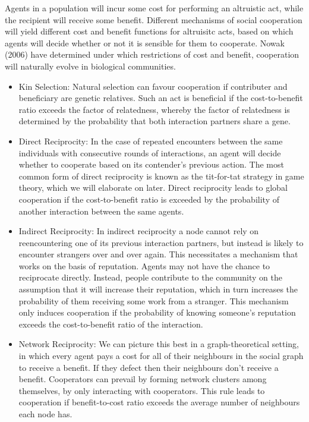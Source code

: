\noindent{}Agents in a population will incur some cost for performing an altruistic act, while the recipient will receive some benefit. Different mechanisms of social cooperation will yield different cost and benefit functions for altruisitc acts, based on which agents will decide whether or not it is sensible for them to cooperate. Nowak (2006) have determined under which restrictions of cost and benefit, cooperation will naturally evolve in biological communities.\vspace{1em}\\

\begin{itemize}
\item Kin Selection: Natural selection can favour cooperation if contributer and beneficiary are genetic relatives. Such an act is beneficial if the cost-to-benefit ratio exceeds the factor of relatedness, whereby the factor of relatedness is determined by the probability that both interaction partners share a gene. 
\item Direct Reciprocity: In the case of repeated encounters between the same individuals with consecutive rounds of interactions, an agent will decide whether to cooperate based on its contender's previous action. The most common form of direct reciprocity is known as the tit-for-tat strategy in game theory, which we will elaborate on later. Direct reciprocity leads to global cooperation if the cost-to-benefit ratio is exceeded by the probability of another interaction between the same agents.
\item Indirect Reciprocity: In indirect reciprocity a node cannot rely on reencountering one of its previous interaction partners, but instead is likely to encounter strangers over and over again. %
This necessitates a mechanism that works on the basis of reputation. Agents may not have the chance to reciprocate directly. Instead, people contribute to the community on the assumption that it will increase their reputation, which in turn increases the probability of them receiving some work from a stranger. This mechanism only induces cooperation if the probability of knowing someone's reputation exceeds the cost-to-benefit ratio of the interaction.
\item Network Reciprocity: We can picture this best in a graph-theoretical setting, in which every agent pays a cost for all of their neighbours in the social graph to receive a benefit. If they defect then their neighbours don't receive a benefit. Cooperators can prevail by forming network clusters among themselves, by only interacting with cooperators. This rule leads to cooperation if benefit-to-cost ratio exceeds the average number of neighbours each node has. 

\end{itemize}

